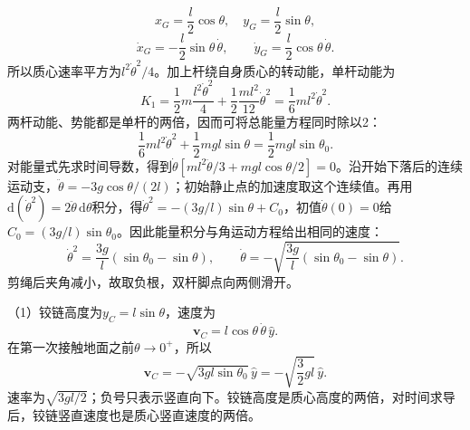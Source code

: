 \documentclass[UTF8,fontset=fandol,a4paper,11pt]{ctexart}
\begin{document}
\[
x_G=\frac l2\cos\theta,\quad y_G=\frac l2\sin\theta,
\]
\[
\dot x_G=-\frac l2\sin\theta\,\dot\theta,\qquad
\dot y_G=\frac l2\cos\theta\,\dot\theta.
\]
所以质心速率平方为$l^2\dot\theta^2/4$。加上杆绕自身质心的转动能，单杆动能为
\[
K_1=\frac12m\frac{l^2\dot\theta^2}{4}
+\frac12\frac{ml^2}{12}\dot\theta^2
=\frac16ml^2\dot\theta^2.
\]
两杆动能、势能都是单杆的两倍，因而可将总能量方程同时除以2：
\[
\frac16ml^2\dot\theta^2+\frac12mgl\sin\theta
=\frac12mgl\sin\theta_0.
\]
对能量式先求时间导数，得到$\dot\theta[ml^2\ddot\theta/3+mgl\cos\theta/2]=0$。沿开始下落后的连续运动支，$\ddot\theta=-3g\cos\theta/(2l)$；初始静止点的加速度取这个连续值。再用$\mathrm d(\dot\theta^2)=2\ddot\theta\,\mathrm d\theta$积分，得$\dot\theta^2=-(3g/l)\sin\theta+C_0$，初值$\dot\theta(0)=0$给$C_0=(3g/l)\sin\theta_0$。因此能量积分与角运动方程给出相同的速度：
\[
\dot\theta^2=\frac{3g}{l}(\sin\theta_0-\sin\theta),
\qquad
\dot\theta=-\sqrt{\frac{3g}{l}(\sin\theta_0-\sin\theta)}.
\]
剪绳后夹角减小，故取负根，双杆脚点向两侧滑开。

（1）铰链高度为$y_C=l\sin\theta$，速度为
\[
\boldsymbol v_C=l\cos\theta\,\dot\theta\,\hat y.
\]
在第一次接触地面之前$\theta\to0^+$，所以
\[
\boxed{\boldsymbol v_C=-\sqrt{3gl\sin\theta_0}\,\hat y
=-\sqrt{\frac32gl}\,\hat y}.
\]
速率为$\sqrt{3gl/2}$；负号只表示竖直向下。铰链高度是质心高度的两倍，对时间求导后，铰链竖直速度也是质心竖直速度的两倍。
\end{document}
